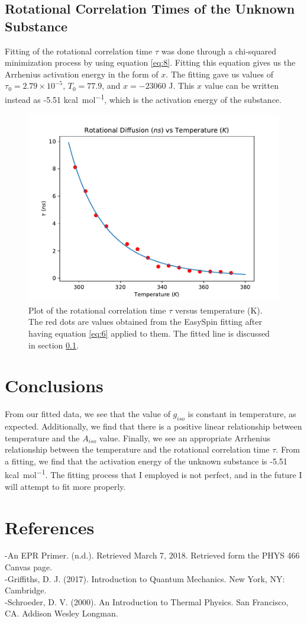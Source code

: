 \documentclass[twocolumn]{article}
\begin{document}
\subsection{Rotational Correlation Times of the Unknown Substance}
\label{sec:ResultsRotCorr}
Fitting of the rotational correlation time $\tau$ was done through a chi-squared minimization process by using equation \ref{eq:8}. Fitting this equation gives us the Arrhenius activation energy in the form of $x$. The fitting gave us values of $\tau_{0}=2.79\times 10^{-5}$, $T_0=77.9$, and $x=-23060$  \si{J}. This $x$ value can be written instead as -5.51 \si{kcal.mol^{-1}}, which is the activation energy of the substance. 
\begin{figure}[h]
	\includegraphics[scale=0.49]{Rot_Dif_plot}
	\caption{Plot of the rotational correlation time $\tau$ versus temperature (\si{K}). The red dots are values obtained from the EasySpin fitting after having equation \ref{eq:6} applied to them. The fitted line is discussed in section \ref{sec:ResultsRotCorr}.\label{fig:fig4}}
\end{figure}
\section{Conclusions}
\label{sec:conclusions}
From our fitted data, we see that the value of $g_{iso}$ is constant in temperature, as expected. Additionally, we find that there is a positive linear relationship between temperature and the $A_{iso}$ value. Finally, we see an appropriate Arrhenius relationship between the temperature and the rotational correlation time $\tau$. From a fitting, we find that the activation energy of the unknown substance is -5.51 \si{kcal.mol^{-1}}. The fitting process that I employed is not perfect, and in the future I will attempt to fit more properly. 
\section{References}
\label{sec:references}
-An EPR Primer. (n.d.). Retrieved March 7, 2018.
Retrieved form the PHYS 466 Canvas page.\\
-Griffiths, D. J. (2017). Introduction to Quantum Mechanics. New York, NY: Cambridge. \\
-Schroeder, D. V. (2000). An Introduction to Thermal Physics. San Francisco, CA. Addison Wesley Longman.
\end{document}
